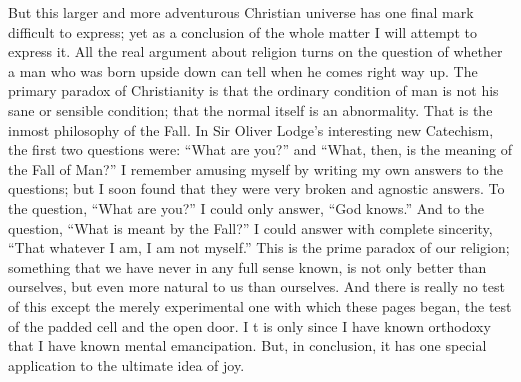 \documentclass{book}
\begin{document}
But this larger and more adventurous Christian universe has one final mark difficult to express; yet as a conclusion of the whole matter I will attempt to express it. All the real argument about religion turns on the question of whether a man who was born upside down can tell when he comes right way up. The primary paradox of Christianity is that the ordinary condition of man is not his sane or sensible condition; that the normal itself is an abnormality. That is the inmost philosophy of the Fall. In Sir Oliver Lodge’s interesting new Catechism, the first two questions were: “What are you?” and “What, then, is the meaning of the Fall of Man?” I remember amusing myself by writing my own answers to the questions; but I soon found that they were very broken and agnostic answers. To the question, “What are you?” I could only answer, “God knows.” And to the question, “What is meant by the Fall?” I could answer with complete sincerity, “That whatever I am, I am not myself.” This is the prime paradox of our religion; something that we have never in any full sense known, is not only better than ourselves, but even more natural to us than ourselves. And there is really no test of this except the merely experimental one with which these pages began, the test of the padded cell and the open door. I t is only since I have known orthodoxy that I have known mental emancipation. But, in conclusion, it has one special application to the ultimate idea of joy.
\end{document}
